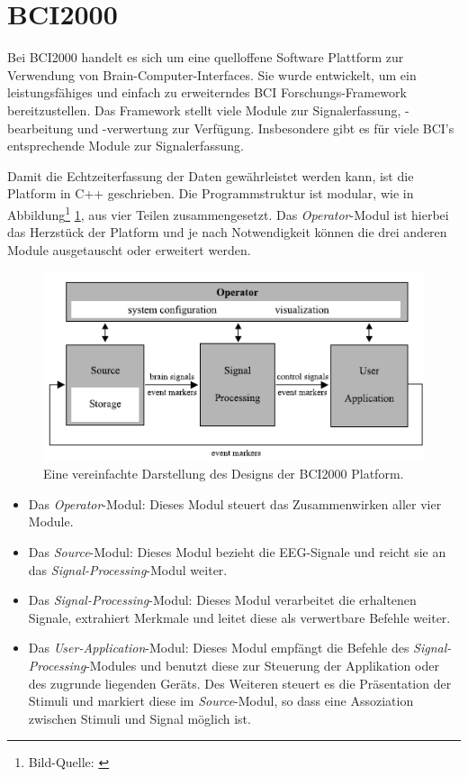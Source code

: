 \pagebreak
\section{BCI2000}
\label{BCI2000}
Bei \acs{BCI2000} handelt es sich um eine quelloffene Software Plattform zur Verwendung von Brain-Computer-Interfaces. 
Sie wurde entwickelt, um ein leistungsfähiges und einfach zu erweiterndes \acs{BCI} Forschungs-Framework bereitzustellen.
Das Framework stellt viele Module zur Signalerfassung, -bearbeitung und -verwertung zur Verfügung. 
Insbesondere gibt es für viele \acs{BCI}'s entsprechende Module zur Signalerfassung.

Damit die Echtzeiterfassung der Daten gewährleistet werden kann, ist die Platform in C++ geschrieben.
Die Programmstruktur ist modular,
wie in Abbildung\footnote[1]{Bild-Quelle: \cite[S.39]{schalk2010practical}} \ref{BCI2000Design},
aus vier Teilen zusammengesetzt.
Das \textit{Operator}-Modul ist hierbei das Herzstück der Platform und je nach Notwendigkeit können die drei anderen Module ausgetauscht oder erweitert werden.\\

\begin{figure}[h!]
\begin{center}
\includegraphics[scale=1]{images/BCI2000Design.png}
\caption{Eine vereinfachte Darstellung des Designs der \acs{BCI2000} Platform.}
\label{BCI2000Design}
\end{center}
\end{figure}

\begin{itemize}
\item Das \textit{Operator}-Modul: Dieses Modul steuert das Zusammenwirken aller vier Module.
\item Das \textit{Source}-Modul: Dieses Modul bezieht die \acs{EEG}-Signale und reicht sie an das \textit{Signal-Processing}-Modul weiter.
\item Das \textit{Signal-Processing}-Modul: Dieses Modul verarbeitet die erhaltenen Sig\-nale, extrahiert Merkmale und leitet diese als verwertbare Befehle weiter.
\item Das \textit{User-Application}-Modul: Dieses Modul empfängt die Befehle des \textit{Signal-Processing}-Modules
und benutzt diese zur Steuerung der Applikation oder des zugrunde liegenden Geräts. Des Weiteren steuert es die Präsentation der Stimuli und markiert diese im \textit{Source}-Modul, 
so dass eine Assoziation zwischen Stimuli und Signal möglich ist. \\
\end{itemize}

